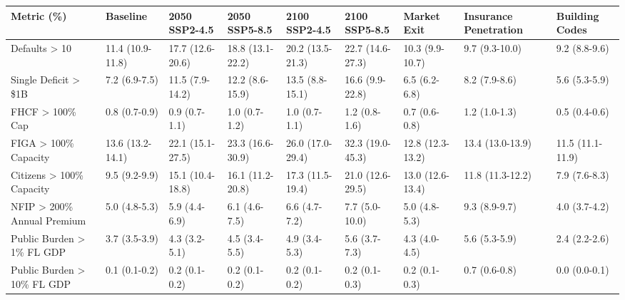 \documentclass[fleqn,10pt]{wlscirep}
\begin{document}
\begin{landscape}
\begin{table}[htb!]
\small
\setlength{\tabcolsep}{3.5pt}

\begin{tabular}{@{}l|l|llll|lll@{}}
\toprule
\textbf{Metric (\%)} &
  \textbf{Baseline} &
  \textbf{2050 SSP2-4.5} &
  \textbf{2050 SSP5-8.5} &
  \textbf{2100 SSP2-4.5} &
  \textbf{2100 SSP5-8.5} &
  \textbf{Market Exit} &
  \textbf{Insurance Penetration} &
  \textbf{Building Codes} \\ \midrule

Defaults > 10 &
  11.4 (10.9-11.8) &
  17.7 (12.6-20.6) &
  18.8 (13.1-22.2) &
  20.2 (13.5-21.3) &
  22.7 (14.6-27.3) &
  10.3 (9.9-10.7) &
  9.7 (9.3-10.0) &
  9.2 (8.8-9.6) \\

Single Deficit > \$1B &
  7.2 (6.9-7.5) &
  11.5 (7.9-14.2) &
  12.2 (8.6-15.9) &
  13.5 (8.8-15.1) &
  16.6 (9.9-22.8) &
  6.5 (6.2-6.8) &
  8.2 (7.9-8.6) &
  5.6 (5.3-5.9) \\

\midrule

FHCF > 100\% Cap &
  0.8 (0.7-0.9) &
  0.9 (0.7-1.1) &
  1.0 (0.7-1.2) &
  1.0 (0.7-1.1) &
  1.2 (0.8-1.6) &
  0.7 (0.6-0.8) &
  1.2 (1.0-1.3) &
  0.5 (0.4-0.6) \\

FIGA > 100\% Capacity &
  13.6 (13.2-14.1) &
  22.1 (15.1-27.5) &
  23.3 (16.6-30.9) &
  26.0 (17.0-29.4) &
  32.3 (19.0-45.3) &
  12.8 (12.3-13.2) &
  13.4 (13.0-13.9) &
  11.5 (11.1-11.9) \\

Citizens > 100\% Capacity &
  9.5 (9.2-9.9) &
  15.1 (10.4-18.8) &
  16.1 (11.2-20.8) &
  17.3 (11.5-19.4) &
  21.0 (12.6-29.5) &
  13.0 (12.6-13.4) &
  11.8 (11.3-12.2) &
  7.9 (7.6-8.3) \\

NFIP > 200\% Annual Premium &
  5.0 (4.8-5.3) &
  5.9 (4.4-6.9) &
  6.1 (4.6-7.5) &
  6.6 (4.7-7.2) &
  7.7 (5.0-10.0) &
  5.0 (4.8-5.3) &
  9.3 (8.9-9.7) &
  4.0 (3.7-4.2) \\

\midrule

Public Burden > 1\% FL GDP &
  3.7 (3.5-3.9) &
  4.3 (3.2-5.1) &
  4.5 (3.4-5.5) &
  4.9 (3.4-5.3) &
  5.6 (3.7-7.3) &
  4.3 (4.0-4.5) &
  5.6 (5.3-5.9) &
  2.4 (2.2-2.6) \\

Public Burden > 10\% FL GDP &
  0.1 (0.1-0.2) &
  0.2 (0.1-0.2) &
  0.2 (0.1-0.2) &
  0.2 (0.1-0.2) &
  0.2 (0.1-0.3) &
  0.2 (0.1-0.3) &
  0.7 (0.6-0.8) &
  0.0 (0.0-0.1) \\

\bottomrule
\end{tabular}
\end{table}
\end{landscape}
\end{document}
